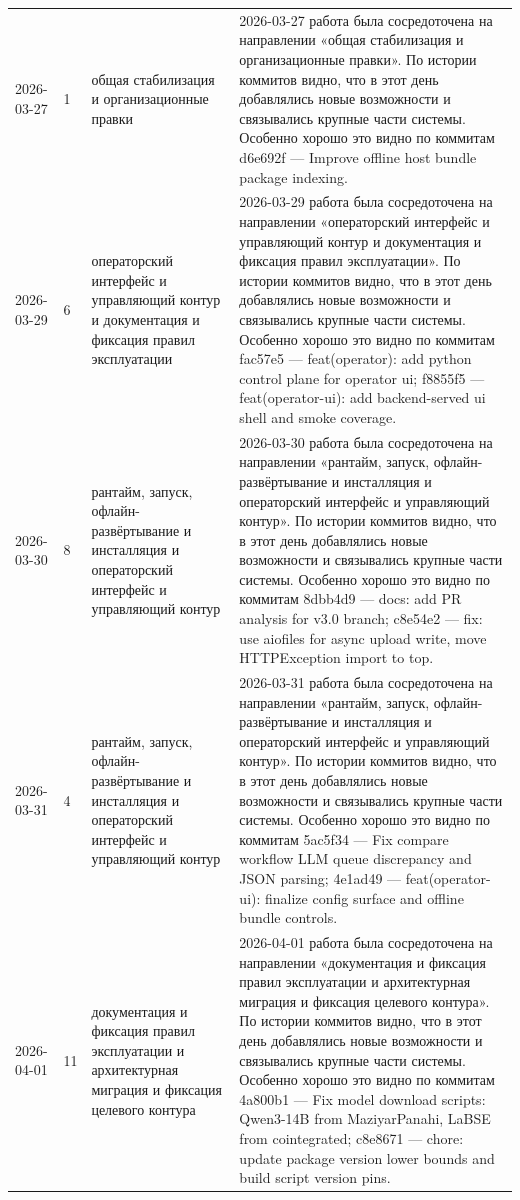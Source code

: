 \begin{longtable}{p{} p{} p{} p{}}
2026-03-27 & 1 & общая стабилизация и организационные правки & 2026-03-27 работа была сосредоточена на направлении «общая стабилизация и организационные правки». По истории коммитов видно, что в этот день добавлялись новые возможности и связывались крупные части системы. Особенно хорошо это видно по коммитам d6e692f — Improve offline host bundle package indexing. \\
2026-03-29 & 6 & операторский интерфейс и управляющий контур и документация и фиксация правил эксплуатации & 2026-03-29 работа была сосредоточена на направлении «операторский интерфейс и управляющий контур и документация и фиксация правил эксплуатации». По истории коммитов видно, что в этот день добавлялись новые возможности и связывались крупные части системы. Особенно хорошо это видно по коммитам fac57e5 — feat(operator): add python control plane for operator ui; f8855f5 — feat(operator-ui): add backend-served ui shell and smoke coverage. \\
2026-03-30 & 8 & рантайм, запуск, офлайн-развёртывание и инсталляция и операторский интерфейс и управляющий контур & 2026-03-30 работа была сосредоточена на направлении «рантайм, запуск, офлайн-развёртывание и инсталляция и операторский интерфейс и управляющий контур». По истории коммитов видно, что в этот день добавлялись новые возможности и связывались крупные части системы. Особенно хорошо это видно по коммитам 8dbb4d9 — docs: add PR analysis for v3.0 branch; c8e54e2 — fix: use aiofiles for async upload write, move HTTPException import to top. \\
2026-03-31 & 4 & рантайм, запуск, офлайн-развёртывание и инсталляция и операторский интерфейс и управляющий контур & 2026-03-31 работа была сосредоточена на направлении «рантайм, запуск, офлайн-развёртывание и инсталляция и операторский интерфейс и управляющий контур». По истории коммитов видно, что в этот день добавлялись новые возможности и связывались крупные части системы. Особенно хорошо это видно по коммитам 5ac5f34 — Fix compare workflow LLM queue discrepancy and JSON parsing; 4e1ad49 — feat(operator-ui): finalize config surface and offline bundle controls. \\
2026-04-01 & 11 & документация и фиксация правил эксплуатации и архитектурная миграция и фиксация целевого контура & 2026-04-01 работа была сосредоточена на направлении «документация и фиксация правил эксплуатации и архитектурная миграция и фиксация целевого контура». По истории коммитов видно, что в этот день добавлялись новые возможности и связывались крупные части системы. Особенно хорошо это видно по коммитам 4a800b1 — Fix model download scripts: Qwen3-14B from MaziyarPanahi, LaBSE from cointegrated; c8e8671 — chore: update package version lower bounds and build script version pins. \\

\end{longtable}
